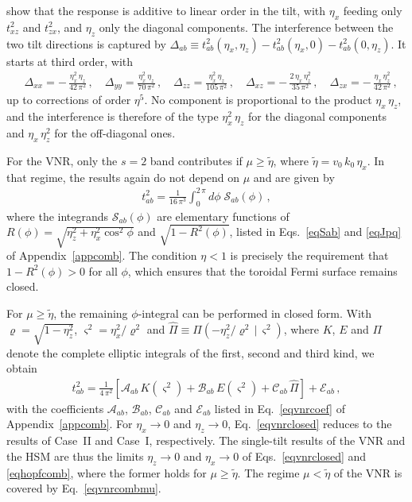 \documentclass[aps,prb,onecolumn,nofootinbib,citeautoscript,10pt]{revtex4-2}
\begin{document}
show that the response is additive to linear order in the tilt, with $\eta_x$ feeding only $t^2_{xz}$ and $t^2_{zx}$, and $\eta_z$ only the diagonal components. The interference between the two tilt directions is captured by $\Delta_{ab}\equiv t^2_{ab}(\eta_x,\eta_z)-t^2_{ab}(\eta_x,0)-t^2_{ab}(0,\eta_z)$. It starts at third order, with
\begin{align}
\label{eqhopfdelta}
& \Delta_{xx} = -\,\frac{\eta_x^2\,\eta_z}{42\,\pi^2}\,, \quad
\Delta_{yy} = \frac{\eta_x^2\,\eta_z}{70\,\pi^2}\,, \quad
\Delta_{zz} = \frac{\eta_x^2\,\eta_z}{105\,\pi^2}\,, \quad
\Delta_{xz} = -\,\frac{2\,\eta_x\,\eta_z^2}{35\,\pi^2}\,, \quad
\Delta_{zx} = -\,\frac{\eta_x\,\eta_z^2}{42\,\pi^2}\,,
\end{align}
up to corrections of order $\eta^5$. No component is proportional to the product $\eta_x\,\eta_z$, and the interference is therefore of the type $\eta_x^2\,\eta_z$ for the diagonal components and $\eta_x\,\eta_z^2$ for the off-diagonal ones.

For the VNR, only the $s=2$ band contributes if $\mu\ge\tilde\eta$, where $\tilde\eta=v_0\,k_0\,\eta_x$. In that regime, the results again do not depend on $\mu$ and are given by
\begin{align}
\label{eqvnrcomb}
t^2_{ab} = \frac{1}{16\,\pi^3} \int_0^{2\,\pi} d\phi \;\mathscr S_{ab}(\phi) \,,
\end{align}
where the integrands $\mathscr S_{ab}(\phi)$ are elementary functions of $R(\phi)=\sqrt{\eta_z^2+\eta_x^2\cos^2\phi}$ and $\sqrt{1-R^2(\phi)}$, listed in Eqs.~\eqref{eqSab} and \eqref{eqJpq} of Appendix~\ref{appcomb}. The condition $\eta<1$ is precisely the requirement that $1-R^2(\phi)>0$ for all $\phi$, which ensures that the toroidal Fermi surface remains closed.

For $\mu\ge\tilde\eta$, the remaining $\phi$-integral can be performed in closed form. With $\varrho=\sqrt{1-\eta_z^2}$, $\varsigma^2=\eta_x^2/\varrho^2$ and $\hat\Pi\equiv\Pi\!\left(-\eta_z^2/\varrho^2\,\big|\,\varsigma^2\right)$, where $K$, $E$ and $\Pi$ denote the complete elliptic integrals of the first, second and third kind, we obtain
\begin{align}
\label{eqvnrclosed}
t^2_{ab} = \frac{1}{4\,\pi^2} \left[ \mathcal A_{ab}\,K(\varsigma^2) + \mathcal B_{ab}\,E(\varsigma^2) + \mathcal C_{ab}\,\hat\Pi \right] + \mathcal E_{ab}\,,
\end{align}
with the coefficients $\mathcal A_{ab}$, $\mathcal B_{ab}$, $\mathcal C_{ab}$ and $\mathcal E_{ab}$ listed in Eq.~\eqref{eqvnrcoef} of Appendix~\ref{appcomb}. For $\eta_x\to0$ and $\eta_z\to0$, Eq.~\eqref{eqvnrclosed} reduces to the results of Case~II and Case~I, respectively. The single-tilt results of the VNR and the HSM are thus the limits $\eta_z\to0$ and $\eta_x\to0$ of Eqs.~\eqref{eqvnrclosed} and \eqref{eqhopfcomb}, where the former holds for $\mu\ge\tilde\eta$. The regime $\mu<\tilde\eta$ of the VNR is covered by Eq.~\eqref{eqvnrcombmu}.
\end{document}
